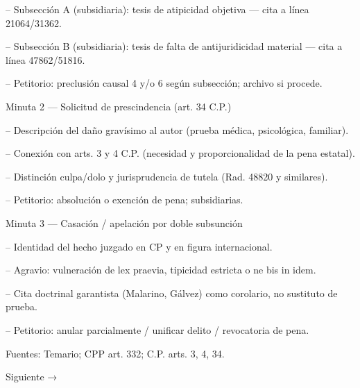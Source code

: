 \documentclass[11pt,a4paper]{article}
\begin{document}
-- Subsección A (subsidiaria): tesis de atipicidad objetiva — cita a línea 21064/31362.\par


-- Subsección B (subsidiaria): tesis de falta de antijuridicidad material — cita a línea 47862/51816.\par


-- Petitorio: preclusión causal 4 y/o 6 según subsección; archivo si procede.\par





      Minuta 2 — Solicitud de prescindencia (art. 34 C.P.)\par



-- Descripción del daño gravísimo al autor (prueba médica, psicológica, familiar).\par


-- Conexión con arts. 3 y 4 C.P. (necesidad y proporcionalidad de la pena estatal).\par


-- Distinción culpa/dolo y jurisprudencia de tutela (Rad. 48820 y similares).\par


-- Petitorio: absolución o exención de pena; subsidiarias.\par





      Minuta 3 — Casación / apelación por doble subsunción\par



-- Identidad del hecho juzgado en CP y en figura internacional.\par


-- Agravio: vulneración de lex praevia, tipicidad estricta o ne bis in idem.\par


-- Cita doctrinal garantista (Malarino, Gálvez) como corolario, no sustituto de prueba.\par


-- Petitorio: anular parcialmente / unificar delito / revocatoria de pena.\par




    Fuentes: Temario; CPP art. 332; C.P. arts. 3, 4, 34.\par

    Siguiente →\par
\end{document}
